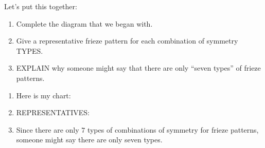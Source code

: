 \documentclass[noauthor,nooutcomes,12pt,hints]{ximera}
\begin{document}
\begin{question}
  Let's put this together:
  \begin{enumerate}
  \item Complete the diagram that we began with.
  \item Give a representative frieze pattern for each combination of symmetry TYPES.
  \item EXPLAIN why someone might say that there are only ``seven
    types'' of frieze patterns.
  \end{enumerate}
  \begin{freeResponse}
    \begin{enumerate}
    \item Here is my chart:
      \begin{center}
      \end{center}
    \item REPRESENTATIVES:
    \item Since there are only $7$ types of combinations of symmetry
      for frieze patterns, someone might say there are only seven
      types.
    \end{enumerate}
  \end{freeResponse}
\end{question}
\end{document}
